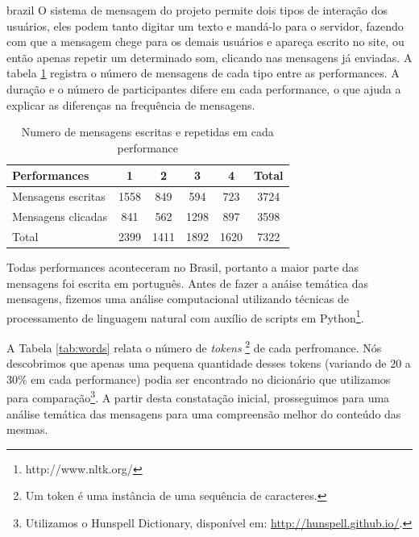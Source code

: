 \begin{otherlanguage*}{brazil}
O sistema de mensagem do projeto permite dois tipos de interação dos usuários, eles podem tanto digitar um texto e mandá-lo para o servidor, fazendo com que a mensagem chege para os demais usuários e apareça escrito no site, ou então apenas repetir um determinado som, clicando nas mensagens já enviadas. A tabela \ref{tab:msgtype} registra o número de mensagens de cada tipo entre as performances. A duração e o número de participantes difere em cada performance, o que ajuda a explicar as diferenças na frequência de mensagens.


\begin{table}[ht!]
\caption{Numero de mensagens escritas e repetidas em cada performance}{%
\begin{tabular}{@{}lccccc@{}}
\hline
Performances 	    & 1 & 2 & 3 & 4 & Total \\
\hline
Mensagens escritas &	1558&   849  &  594  &  723 & 3724 \\
Mensagens clicadas &	841 &   562  &  1298 &  897 & 3598 \\
Total &				2399&   1411 &  1892 & 1620 & 7322 \\
\end{tabular}}
\label{tab:msgtype}
\end{table}


Todas performances aconteceram no Brasil, portanto a maior parte das mensagens foi escrita em português. Antes de fazer a anáise temática das mensagens, fizemos uma análise computacional utilizando técnicas de processamento de linguagem natural com auxílio de scripts em Python\footnote{http://www.nltk.org/}. 

A Tabela \ref{tab:words} relata o número de \emph{tokens} \footnote{Um token é uma instância de uma sequência de caracteres.} de cada perfromance. Nós descobrimos que apenas uma pequena quantidade desses tokens (variando de 20 a 30\% em cada performance) podia ser encontrado no dicionário que utilizamos para comparação\footnote{Utilizamos o Hunspell Dictionary, disponível em: \url{http://hunspell.github.io/}.}. A partir desta constatação inicial, prosseguimos para uma análise temática das mensagens para uma compreensão melhor do conteúdo das mesmas.



\end{otherlanguage*}
